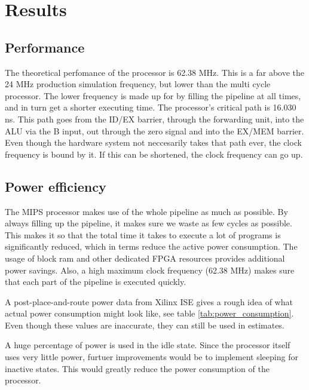\section{Results}

\subsection{Performance}

The theoretical perfomance of the processor is 62.38 MHz.
This is a far above the 24 MHz production simulation frequency, but lower than the multi cycle processor.
The lower frequency is made up for by filling the pipeline at all times, and in turn get a shorter executing time.
The processor's critical path is 16.030 ns.
This path goes from the ID/EX barrier, through the forwarding unit, into the ALU via the B input, out through the zero signal and into the EX/MEM barrier.
Even though the hardware system not neccesarily takes that path ever, the clock frequency is bound by it.
If this can be shortened, the clock frequency can go up.


\subsection{Power efficiency}

The MIPS processor makes use of the whole pipeline as much as possible.
By always filling up the pipeline, it makes sure we waste as few cycles as possible.
This makes it so that the total time it takes to execute a lot of programs is significantly reduced, which in terms reduce the active power consumption.
The usage of block ram and other dedicated FPGA resources provides additional power savings.
Also, a high maximum clock frequency (62.38 MHz) makes sure that each part of the pipeline is executed quickly.

A post-place-and-route power data from Xilinx ISE gives a rough idea of what actual power consumption might look like, see table \ref{tab:power_consumption}.
Even though these values are inaccurate, they can still be used in estimates.

A huge percentage of power is used in the idle state.
Since the processor itself uses very little power, furtuer improvements would be to implement sleeping for inactive states.
This would greatly reduce the power consumption of the processor.

